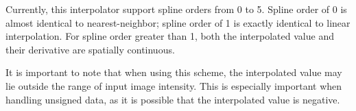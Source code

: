 Currently, this interpolator support spline orders
from 0 to 5. Spline order of 0 is almost identical to nearest-neighbor;
spline order of 1 is exactly identical to linear interpolation. For 
spline order greater than 1, both the interpolated value and their
derivative are spatially continuous.

It is important to note that when using this scheme, the interpolated
value may lie outside the range of input image intensity. This is
especially important when handling unsigned data, as it is possible
that the interpolated value is negative.


